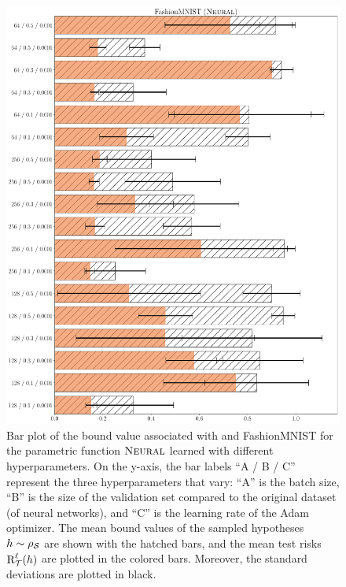\documentclass[twoside]{article}
\theoremstyle{plain}
\begin{document}
\begin{figure}
\centering
\includegraphics[width=0.9\linewidth]{figures/fig_7_fashion.pdf}
\caption{\label{fig:neural-fashion}
Bar plot of the bound value associated with  and FashionMNIST for the parametric function $\text{\sc Neural}$ learned with different hyperparameters.
On the y-axis, the bar labels ``A / B / C'' represent the three hyperparameters that vary: ``A'' is the batch size, ``B'' is the size of the validation set compared to the original dataset (of neural networks), and ``C'' is the learning rate of the Adam optimizer.
The mean bound values of the sampled hypotheses $h\sim\rho_{\mathcal{S}}$ are shown with the hatched bars, and the mean test risks $\text{R}^{\ell}_{\mathcal{T}}(h)$ are plotted in the colored bars.
Moreover, the standard deviations are plotted in black.
}
\end{figure}
\end{document}
